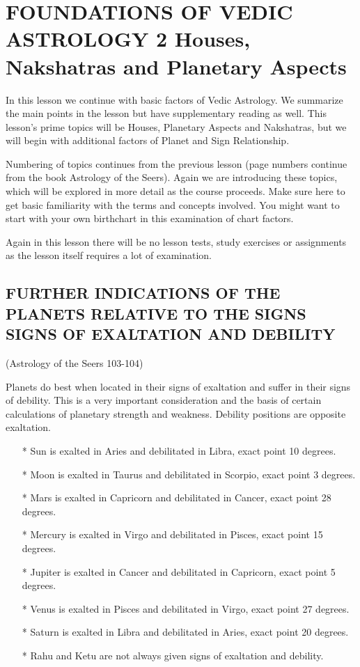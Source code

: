 \section{FOUNDATIONS OF VEDIC ASTROLOGY 2 
Houses, Nakshatras and Planetary Aspects}

In this lesson we continue with basic factors of Vedic Astrology. We summarize the main points in the lesson but have supplementary reading as well. This lesson’s prime topics will be Houses, Planetary Aspects and Nakshatras, but we will begin with additional factors of Planet and Sign Relationship.

 

Numbering of topics continues from the previous lesson (page numbers continue from the book Astrology of the Seers). Again we are introducing these topics, which will be explored in more detail as the course proceeds. Make sure here to get  basic familiarity with the terms and concepts involved. You might want to start with your own birthchart in this examination of chart factors.

 Again in this lesson there will be no lesson tests, study exercises or assignments as the lesson itself requires a lot of examination.

 

\subsection{FURTHER INDICATIONS OF THE PLANETS RELATIVE TO THE SIGNS
SIGNS OF EXALTATION AND DEBILITY }(Astrology of the Seers 103-104)

 

Planets do best when located in their signs of exaltation and suffer in their signs of debility. This is a very important consideration and the basis of certain calculations of planetary strength and weakness. Debility positions are opposite exaltation.

 

\begin{enumerate}
\item[*] Sun is exalted in Aries and debilitated in Libra, exact point 10 degrees.
\item[*] Moon is exalted in Taurus and debilitated in Scorpio, exact point 3 degrees.
\item[*] Mars is exalted in Capricorn and debilitated in Cancer, exact point 28 degrees.
\item[*] Mercury is exalted in Virgo and debilitated in Pisces, exact point 15 degrees.
\item[*] Jupiter is exalted in Cancer and debilitated in Capricorn, exact point 5 degrees.
\item[*] Venus is exalted in Pisces and debilitated in Virgo, exact point 27 degrees.
\item[*] Saturn is exalted in Libra and debilitated in Aries, exact point 20 degrees.
\item[*] Rahu and Ketu are not always given signs of exaltation and debility.
 \end{enumerate}

